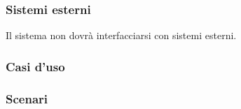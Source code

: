 \subsubsection{Sistemi esterni}
\label{sec:esterno}

Il sistema non dovrà interfacciarsi con sistemi esterni.


\newpage %
\subsubsection{Casi d'uso}

\begin{figure}[h!]
  \centering
\end{figure}

\newpage %
\subsubsection{Scenari}
\hfill \break

